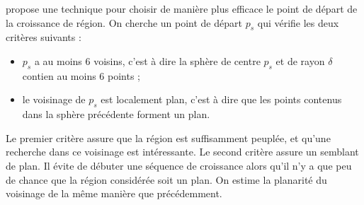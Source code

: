 ﻿\documentclass[12pt, twoside]{article}
\begin{document}
\cite{reggrow2} propose une technique pour choisir de manière plus efficace le point de départ de la croissance de région. On cherche un point de départ $p_s$ qui vérifie les deux critères suivants :
\begin{itemize}
  \item $p_s$ a au moins 6 voisins, c'est à dire la sphère de centre $p_s$ et de rayon $\delta$ contien au moins 6 points ;
  \item le voisinage de $p_s$ est localement plan, c'est à dire que les points contenus dans la sphère précédente forment un plan.
\end{itemize}
Le premier critère assure que la région est suffisamment peuplée, et qu’une recherche dans ce voisinage est intéressante. Le second critère assure un semblant de plan. Il évite de débuter une séquence de croissance alors qu’il n’y a que peu de chance que la région considérée soit un plan. On estime la planarité du voisinage de la même manière que précédemment.
\end{document}
